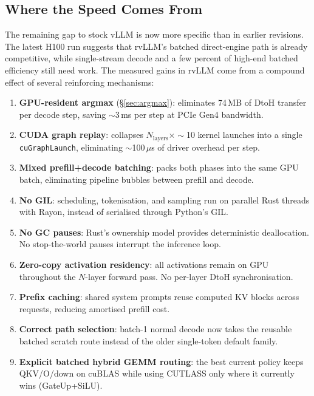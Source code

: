 \subsection{Where the Speed Comes From}

The remaining gap to stock vLLM is now more specific than in earlier revisions.
The latest H100 run suggests that rvLLM's batched direct-engine path is already
competitive, while single-stream decode and a few percent of high-end batched
efficiency still need work. The measured gains in rvLLM come from a compound
effect of several reinforcing mechanisms:

\begin{enumerate}
  \item \textbf{GPU-resident argmax} (\S\ref{sec:argmax}): eliminates 74\,MB of
        DtoH transfer per decode step, saving $\sim$3\,ms per step at PCIe Gen4
        bandwidth.
  \item \textbf{CUDA graph replay}: collapses $N_{\text{layers}} \times \sim$10
        kernel launches into a single \texttt{cuGraphLaunch}, eliminating
        $\sim$100\,$\mu$s of driver overhead per step.
  \item \textbf{Mixed prefill+decode batching}: packs both phases into the same GPU
        batch, eliminating pipeline bubbles between prefill and decode.
  \item \textbf{No GIL}: scheduling, tokenisation, and sampling run on parallel Rust
        threads with Rayon, instead of serialised through Python's GIL.
  \item \textbf{No GC pauses}: Rust's ownership model provides deterministic
        deallocation. No stop-the-world pauses interrupt the inference loop.
  \item \textbf{Zero-copy activation residency}: all activations remain on GPU
        throughout the $N$-layer forward pass. No per-layer DtoH synchronisation.
  \item \textbf{Prefix caching}: shared system prompts reuse computed KV blocks
        across requests, reducing amortised prefill cost.
  \item \textbf{Correct path selection}: batch-1 normal decode now takes the reusable
        batched scratch route instead of the older single-token default family.
  \item \textbf{Explicit batched hybrid GEMM routing}: the best current policy keeps
        QKV/O/down on cuBLAS while using CUTLASS only where it currently wins
        (GateUp+SiLU).
\end{enumerate}

